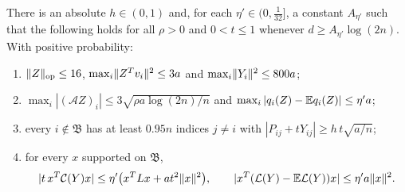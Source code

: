 \begin{lemma}\label{lem:sample}
There is an absolute $h\in(0,1)$ and, for each $\eta'\in(0,\frac1{32}]$, a
constant $A_{\eta'}$ such that the following holds for all $\rho>0$ and
$0<t\le1$ whenever $d\ge A_{\eta'}\log(2n)$. With positive probability:
\begin{enumerate}[label=\textup{(S\arabic*)}]
\item\label{S1} $\lVert Z\rVert_{\mathrm{op}}\le16$, $\max_i\lVert Z^Tv_i\rVert^2\le3a$ and
$\max_i\lVert Y_i\rVert^2\le800a$;
\item\label{S2} $\max_i|(\mathcal AZ)_i|\le3\sqrt{\rho a\log(2n)/n}$ and
$\max_i|q_i(Z)-\mathbb E q_i(Z)|\le\eta'a$;
\item\label{S3} every $i\notin\mathfrak B$ has at least $0.95n$ indices
$j\ne i$ with $|P_{ij}+tY_{ij}|\ge h\,t\sqrt{a/n}$;
\item\label{S4} for every $x$ supported on $\mathfrak B$,
\[
 |t\,x^T\mathcal C(Y)x|\le\eta'\bigl(x^TLx+at^2\lVert x\rVert^2\bigr),\qquad
 |x^T(\mathcal L(Y)-\mathbb E\mathcal L(Y))x|\le\eta'a\lVert x\rVert^2 .
\]
\end{enumerate}
\end{lemma}

